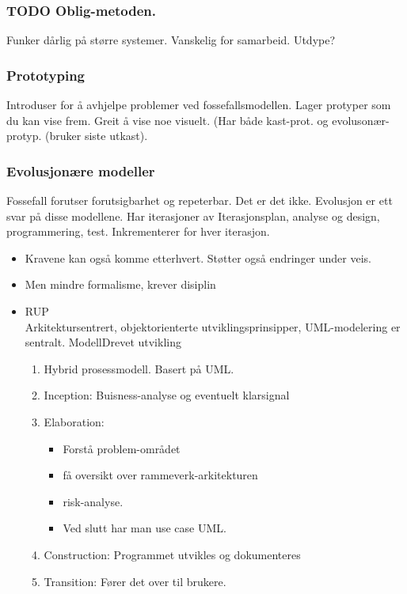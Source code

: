 \documentclass[11pt]{article}
\begin{document}
\subsubsection{\textbf{TODO} Oblig-metoden.}
\label{sec-4.1.8}

    Funker dårlig på større systemer. Vanskelig for samarbeid.
    Utdype?
\subsubsection{Prototyping}
\label{sec-4.1.9}


    Introduser for å avhjelpe problemer ved fossefallsmodellen. Lager protyper som du kan vise frem. 
    Greit å vise noe visuelt. (Har både kast-prot. og evolusonær-protyp. (bruker siste utkast).
\subsubsection{Evolusjonære modeller}
\label{sec-4.1.10}


    Fossefall forutser forutsigbarhet og repeterbar. Det er det ikke. Evolusjon er ett svar på disse modellene. 
    Har iterasjoner av Iterasjonsplan, analyse og design, programmering, test. Inkrementerer for hver iterasjon. 
\begin{itemize}
\item Kravene kan også komme etterhvert. Støtter også endringer under veis.
\end{itemize}
    
\begin{itemize}
\item Men mindre formalisme, krever disiplin
\end{itemize}
\begin{itemize}

\item RUP\\
\label{sec-4.1.10.1}%
Arkitektursentrert, objektorienterte utviklingsprinsipper, UML-modelering er sentralt.
    ModellDrevet utvikling

\begin{enumerate}
\item Hybrid prosessmodell. Basert på UML.
\item Inception: 
       Buisness-analyse og eventuelt klarsignal
\item Elaboration:

\begin{itemize}
\item Forstå problem-området
\item få oversikt over rammeverk-arkitekturen
\item risk-analyse.
\item Ved slutt har man use case UML.
\end{itemize}

\item Construction: 
       Programmet utvikles og dokumenteres
\item Transition: 
       Fører det over til brukere.
\end{enumerate}

\end{itemize} %
\end{document}

